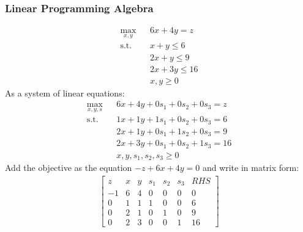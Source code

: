 \documentclass[12pt,handout]{beamer}
\begin{document}
\begin{frame}
\frametitle{Linear Programming Algebra}
\tiny
\begin{eqnarray}
\max_{x,y} && 6x + 4y = z \nonumber \\
\mbox{s.t.} && x + y \le 6 \nonumber \\
&& 2x + y \le 9 \nonumber \\
&& 2x + 3y \le 16 \nonumber \\
&& x, y \ge 0 \nonumber
\end{eqnarray}
As a system of linear equations:
\begin{eqnarray}
\max_{x,y,s} && 6x + 4y + 0 s_1 + 0 s_2 + 0 s_3 = z\nonumber \\
\mbox{s.t.} && 1x + 1y + 1s_1 + 0 s_2 + 0 s_3 = 6 \nonumber \\
&& 2x + 1y + 0s_1 + 1s_2 + 0s_3 = 9 \nonumber \\
&& 2x + 3y + 0s_1 + 0s_2 + 1s_3 = 16 \nonumber \\
&& x, y, s_1, s_2, s_3 \ge 0 \nonumber
\end{eqnarray}
Add the objective as the equation $-z + 6x + 4y = 0$ and write in matrix form:
\begin{eqnarray}
\left[ \begin{array}{rrrrrr|r}
z & x & y & s_1 & s_2 & s_3 & RHS \\
-1 & 6 & 4 & 0 & 0 & 0 & 0 \\
0 & 1 & 1 & 1 & 0 & 0 & 6 \\
0 & 2 & 1 & 0 & 1 & 0 & 9 \\
0 & 2 & 3 & 0 & 0 & 1 & 16
\end{array} \right] \nonumber
\end{eqnarray}
\end{frame}
\end{document}
